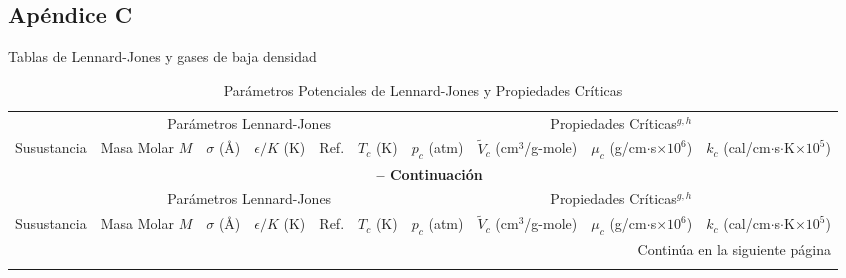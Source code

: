 
\begin{landscape} %
\section{Apéndice C} 
Tablas de Lennard-Jones y gases de baja densidad
\pagestyle{empty} %

\begin{longtable}{p{2.6cm}p{1.3cm}|p{1.5cm}p{1.5cm}p{0.5cm}|p{1.5cm}p{1.5cm}p{1.5cm}|p{2cm}p{1.8cm}}
\caption{Parámetros Potenciales de Lennard-Jones  y Propiedades Críticas} \\
\toprule
 & \multicolumn{5}{c}{Parámetros Lennard-Jones} & \multicolumn{4}{c}{Propiedades Críticas$^{g,h}$} \\
\cmidrule(lr){2-5} \cmidrule(lr){6-10}
Susustancia &Masa Molar $M$& $\sigma$ (\AA) & $\epsilon/K$ (K) & Ref. & $T_c$ (K) & $p_c$ (atm) & $\tilde{V}_c$ (cm$^3$/g-mole) & $\mu_c$ \space (g/cm$\cdot$s$\times10^6$) & $k_c$ (cal/cm$\cdot$s$\cdot$K$\times 10^5$) \\
\midrule
\endfirsthead %
\multicolumn{10}{c}{{\bfseries \tablename\ \thetable{} -- Continuación}} \\
\toprule
 & \multicolumn{5}{c}{Parámetros Lennard-Jones } & \multicolumn{4}{c}{Propiedades Críticas$^{g,h}$} \\
\cmidrule(lr){2-5} \cmidrule(lr){6-10}
Susustancia &Masa Molar $M$& $\sigma$ (\AA) & $\epsilon/K$ (K) & Ref. & $T_c$ (K) & $p_c$ (atm) & $\tilde{V}_c$ (cm$^3$/g-mole) & $\mu_c$ \space (g/cm$\cdot$s$\times10^6$) & $k_c$ (cal/cm$\cdot$s$\cdot$K$\times 10^5$) \\
\midrule
\endhead %
\midrule
\multicolumn{10}{r}{{Continúa en la siguiente página}} \\
\endfoot %
\bottomrule
\endlastfoot 


\end{longtable}
\end{landscape}
